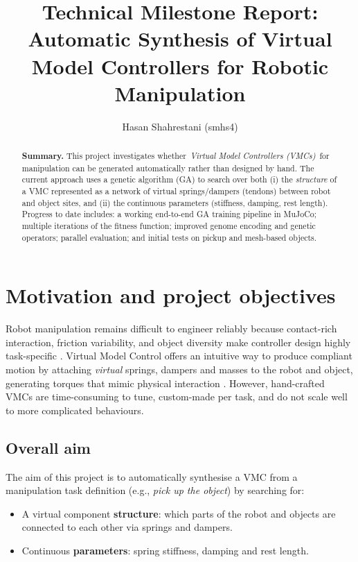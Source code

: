 \documentclass[12pt,a4paper,twocolumn]{article}
\title{Technical Milestone Report: Automatic Synthesis of Virtual Model Controllers for Robotic Manipulation}
\author{Hasan Shahrestani (smhs4)}
\begin{document}
\maketitle

\begin{abstract}
\textbf{Summary.} This project investigates whether \,\emph{Virtual Model Controllers (VMCs)}\, for manipulation can be generated automatically rather than designed by hand. The current approach uses a genetic algorithm (GA) to search over both (i) the \emph{structure} of a VMC represented as a network of virtual springs/dampers (tendons) between robot and object sites, and (ii) the continuous parameters (stiffness, damping, rest length). Progress to date includes: a working end-to-end GA training pipeline in MuJoCo; multiple iterations of the fitness function; improved genome encoding and genetic operators; parallel evaluation; and initial tests on pickup and mesh-based objects.
\end{abstract}

\section{Motivation and project objectives}
Robot manipulation remains difficult to engineer reliably because contact-rich interaction, friction variability, and object diversity make controller design highly task-specific \cite{suomalainen2021contactsurvey}. Virtual Model Control offers an intuitive way to produce compliant motion by attaching \emph{virtual} springs, dampers and masses to the robot and object, generating torques that mimic physical interaction \cite{pratt2001vmc}. However, hand-crafted VMCs are time-consuming to tune, custom-made per task, and do not scale well to more complicated behaviours.

\subsection{Overall aim}
The aim of this project is to automatically synthesise a VMC from a manipulation task definition (e.g., \emph{pick up the object}) by searching for:
\begin{itemize}
    \item A virtual component \textbf{structure}: which parts of the robot and objects are connected to each other via springs and dampers.
    \item Continuous \textbf{parameters}: spring stiffness, damping and rest length.
\end{itemize}
\end{document}
